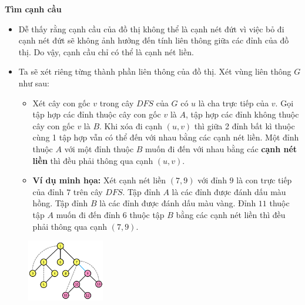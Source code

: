 \documentclass{article}
\begin{document}
\textbf{Tìm cạnh cầu}
\begin{itemize}
    \item Dễ thấy rằng cạnh cầu của đồ thị không thể là cạnh nét đứt vì việc bỏ đi cạnh nét đứt sẽ không ảnh hưởng đến tính liên thông giữa các đỉnh của đồ thị. Do vậy, cạnh cầu chỉ có thể là cạnh nét liền.
    \item Ta sẽ xét riêng từng thành phần liên thông của đồ thị. Xét vùng liên thông $G$ như sau:
    \begin{itemize}
        \item Xét cây con gốc $v$ trong cây $DFS$ của $G$ có $u$ là cha trực tiếp của $v$. Gọi tập hợp các đỉnh thuộc cây con gốc $v$ là $A$, tập hợp các đỉnh không thuộc cây con gốc $v$ là $B$. Khi xóa đi cạnh $(u, v)$ thì giữa 2 đỉnh bất kì thuộc cùng 1 tập hợp vẫn có thể đến với nhau bằng các cạnh nét liền. Một đỉnh thuộc $A$ với một đỉnh thuộc $B$ muốn đi đến với nhau bằng các \textbf{cạnh nét liền} thì đều phải thông qua cạnh $(u, v)$.
        \item \textbf{Ví dụ minh họa:} Xét cạnh nét liền $(7, 9)$ với đỉnh $9$ là con trực tiếp của đỉnh $7$ trên cây $DFS$. Tập đỉnh $A$ là các đỉnh được đánh dấu màu hồng. Tập đỉnh $B$ là các đỉnh được đánh dấu màu vàng. Đỉnh $11$ thuộc tập $A$ muốn đi đến đỉnh $6$ thuộc tập $B$ bằng các cạnh nét liền thì đều phải thông qua cạnh $(7, 9)$.
    \end{itemize}
\end{itemize}

\begin{figure}[h]
    \centering
    \includegraphics[width=0.3\textwidth]{img/b4/Depth-First-Search-Tree_img6.png}
\end{figure}
\end{document}
